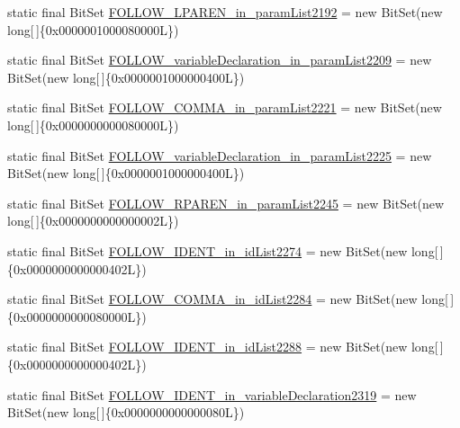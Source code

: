 \begin{DoxyCompactItemize}
\item 
static final Bit\-Set \hyperlink{classorg_1_1tzi_1_1use_1_1parser_1_1soil_1_1_soil_parser_a579222da2a4ecd4ffdf6fd97681ddcfe}{F\-O\-L\-L\-O\-W\-\_\-\-L\-P\-A\-R\-E\-N\-\_\-in\-\_\-param\-List2192} = new Bit\-Set(new long\mbox{[}$\,$\mbox{]}\{0x0000001000080000\-L\})
\item 
static final Bit\-Set \hyperlink{classorg_1_1tzi_1_1use_1_1parser_1_1soil_1_1_soil_parser_a6d2013c72d53cf8f5b083c6e4cd5d2ef}{F\-O\-L\-L\-O\-W\-\_\-variable\-Declaration\-\_\-in\-\_\-param\-List2209} = new Bit\-Set(new long\mbox{[}$\,$\mbox{]}\{0x0000001000000400\-L\})
\item 
static final Bit\-Set \hyperlink{classorg_1_1tzi_1_1use_1_1parser_1_1soil_1_1_soil_parser_a85e7ec87570df988efc5e8fc8c11a443}{F\-O\-L\-L\-O\-W\-\_\-\-C\-O\-M\-M\-A\-\_\-in\-\_\-param\-List2221} = new Bit\-Set(new long\mbox{[}$\,$\mbox{]}\{0x0000000000080000\-L\})
\item 
static final Bit\-Set \hyperlink{classorg_1_1tzi_1_1use_1_1parser_1_1soil_1_1_soil_parser_aaf387d64ca7b8ab71726e2ce725f83af}{F\-O\-L\-L\-O\-W\-\_\-variable\-Declaration\-\_\-in\-\_\-param\-List2225} = new Bit\-Set(new long\mbox{[}$\,$\mbox{]}\{0x0000001000000400\-L\})
\item 
static final Bit\-Set \hyperlink{classorg_1_1tzi_1_1use_1_1parser_1_1soil_1_1_soil_parser_a9edf966d1260f5131760592d1417e7da}{F\-O\-L\-L\-O\-W\-\_\-\-R\-P\-A\-R\-E\-N\-\_\-in\-\_\-param\-List2245} = new Bit\-Set(new long\mbox{[}$\,$\mbox{]}\{0x0000000000000002\-L\})
\item 
static final Bit\-Set \hyperlink{classorg_1_1tzi_1_1use_1_1parser_1_1soil_1_1_soil_parser_a40271b1d02383ad612e5fb8e47885d7d}{F\-O\-L\-L\-O\-W\-\_\-\-I\-D\-E\-N\-T\-\_\-in\-\_\-id\-List2274} = new Bit\-Set(new long\mbox{[}$\,$\mbox{]}\{0x0000000000000402\-L\})
\item 
static final Bit\-Set \hyperlink{classorg_1_1tzi_1_1use_1_1parser_1_1soil_1_1_soil_parser_a50ea6a92939e5896b7fca208904eae69}{F\-O\-L\-L\-O\-W\-\_\-\-C\-O\-M\-M\-A\-\_\-in\-\_\-id\-List2284} = new Bit\-Set(new long\mbox{[}$\,$\mbox{]}\{0x0000000000080000\-L\})
\item 
static final Bit\-Set \hyperlink{classorg_1_1tzi_1_1use_1_1parser_1_1soil_1_1_soil_parser_a89acde1c72f62b3375713198ae3c328a}{F\-O\-L\-L\-O\-W\-\_\-\-I\-D\-E\-N\-T\-\_\-in\-\_\-id\-List2288} = new Bit\-Set(new long\mbox{[}$\,$\mbox{]}\{0x0000000000000402\-L\})
\item 
static final Bit\-Set \hyperlink{classorg_1_1tzi_1_1use_1_1parser_1_1soil_1_1_soil_parser_a51267b6ff26971a2695a77d8c4d240ee}{F\-O\-L\-L\-O\-W\-\_\-\-I\-D\-E\-N\-T\-\_\-in\-\_\-variable\-Declaration2319} = new Bit\-Set(new long\mbox{[}$\,$\mbox{]}\{0x0000000000000080\-L\})

\end{DoxyCompactItemize}
